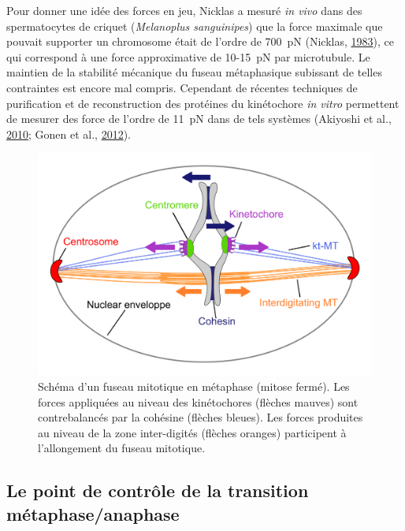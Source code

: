 \documentclass[12pt,a4paper,twoside,openright]{book}
\begin{document}
Pour donner une idée des forces en jeu, Nicklas a mesuré \emph{in vivo}
dans des spermatocytes de criquet (\emph{Melanoplus sanguinipes}) que la
force maximale que pouvait supporter un chromosome était de l'ordre de
700~pN (Nicklas, \protect\hyperlink{ref-Nicklas1983}{1983}), ce qui
correspond à une force approximative de 10-15~pN par microtubule. Le
maintien de la stabilité mécanique du fuseau métaphasique subissant de
telles contraintes est encore mal compris. Cependant de récentes
techniques de purification et de reconstruction des protéines du
kinétochore \emph{in vitro} permettent de mesurer des force de l'ordre
de 11~pN dans de tels systèmes (Akiyoshi et al.,
\protect\hyperlink{ref-Akiyoshi2010a}{2010}; Gonen et al.,
\protect\hyperlink{ref-Gonen2012a}{2012}).

\begin{figure}[htbp]
\centering
\includegraphics{figures/intro/spindle.png}
\caption[Schéma d'un fuseau mitotique en métaphase]{\label{fig:spindle}Schéma
d'un fuseau mitotique en métaphase (mitose fermé). Les forces appliquées
au niveau des kinétochores (flèches mauves) sont contrebalancés par la
cohésine (flèches bleues). Les forces produites au niveau de la zone
inter-digités (flèches oranges) participent à l'allongement du fuseau
mitotique.}
\end{figure}

\subsection{Le point de contrôle de la transition
métaphase/anaphase}\label{le-point-de-contruxf4le-de-la-transition-muxe9taphaseanaphase}

\label{sec:sac}
\end{document}
